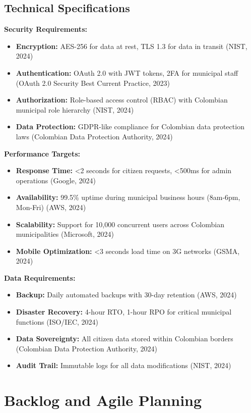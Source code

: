 \documentclass[12pt,a4paper]{article}
\begin{document}
\subsection{Technical Specifications}

\textbf{Security Requirements:}
\begin{itemize}
    \item \textbf{Encryption:} AES-256 for data at rest, TLS 1.3 for data in transit (NIST, 2024)
    \item \textbf{Authentication:} OAuth 2.0 with JWT tokens, 2FA for municipal staff (OAuth 2.0 Security Best Current Practice, 2023)
    \item \textbf{Authorization:} Role-based access control (RBAC) with Colombian municipal role hierarchy (NIST, 2024)
    \item \textbf{Data Protection:} GDPR-like compliance for Colombian data protection laws (Colombian Data Protection Authority, 2024)
\end{itemize}

\textbf{Performance Targets:}
\begin{itemize}
    \item \textbf{Response Time:} <2 seconds for citizen requests, <500ms for admin operations (Google, 2024)
    \item \textbf{Availability:} 99.5\% uptime during municipal business hours (8am-6pm, Mon-Fri) (AWS, 2024)
    \item \textbf{Scalability:} Support for 10,000 concurrent users across Colombian municipalities (Microsoft, 2024)
    \item \textbf{Mobile Optimization:} <3 seconds load time on 3G networks (GSMA, 2024)
\end{itemize}

\textbf{Data Requirements:}
\begin{itemize}
    \item \textbf{Backup:} Daily automated backups with 30-day retention (AWS, 2024)
    \item \textbf{Disaster Recovery:} 4-hour RTO, 1-hour RPO for critical municipal functions (ISO/IEC, 2024)
    \item \textbf{Data Sovereignty:} All citizen data stored within Colombian borders (Colombian Data Protection Authority, 2024)
    \item \textbf{Audit Trail:} Immutable logs for all data modifications (NIST, 2024)
\end{itemize}

\section{Backlog and Agile Planning}
\end{document}
